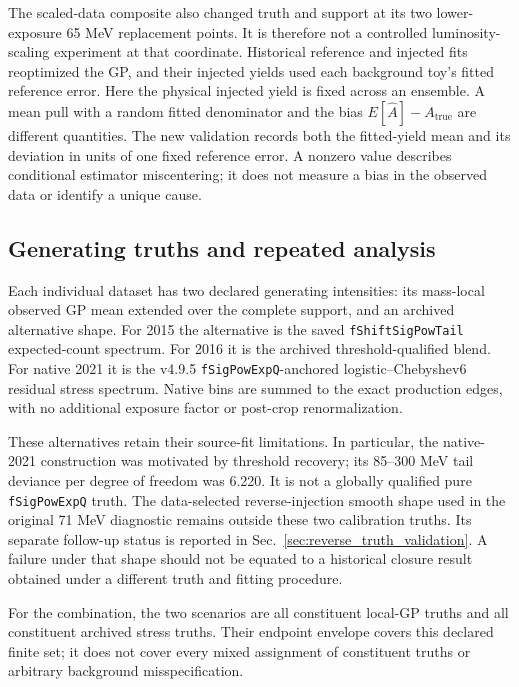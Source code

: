 The scaled-data composite also changed truth and support at its two
lower-exposure 65 MeV replacement points. It is therefore not a controlled
luminosity-scaling experiment at that coordinate. Historical reference and
injected fits reoptimized the GP, and their injected yields used each
background toy's fitted reference error. Here the physical injected yield
is fixed across an ensemble. A mean pull with a random fitted denominator
and the bias $E[\hat A]-A_{\mathrm{true}}$ are different quantities.
The new validation records both the fitted-yield mean and its deviation in
units of one fixed reference error. A nonzero value describes conditional
estimator miscentering; it does not measure a bias in the observed data or
identify a unique cause.

\clearpage
\subsection{Generating truths and repeated analysis}

Each individual dataset has two declared generating intensities: its
mass-local observed GP mean extended over the complete support, and an
archived alternative shape. For 2015 the alternative is the saved
\texttt{fShiftSigPowTail} expected-count spectrum. For 2016 it is the archived
threshold-qualified blend. For native 2021 it is the v4.9.5
\texttt{fSigPowExpQ}-anchored logistic--Chebyshev6 residual stress spectrum.
Native bins are summed to the exact production edges, with no additional
exposure factor or post-crop renormalization.

These alternatives retain their source-fit limitations. In particular,
the native-2021 construction was motivated by threshold recovery; its
85--300 MeV tail deviance per degree of freedom was 6.220. It is not a
globally qualified pure \texttt{fSigPowExpQ} truth. The data-selected
reverse-injection smooth shape used in the original 71 MeV diagnostic
remains outside these two calibration truths. Its separate follow-up status
is reported in Sec.~\ref{sec:reverse_truth_validation}. A failure under that
shape should not be equated to a historical closure result obtained under
a different truth and fitting procedure.

For the combination, the two scenarios are all constituent local-GP
truths and all constituent archived stress truths. Their endpoint envelope
covers this declared finite set; it does not cover every mixed assignment
of constituent truths or arbitrary background misspecification.

